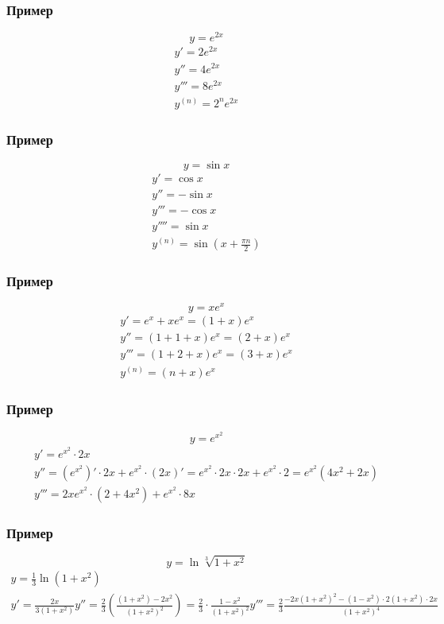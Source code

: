 \documentclass{article}
\begin{document}
\subsubsection{Пример}
\[
    y = e^{2x} 
\]
\begin{gather*}
    y'      = 2e^{2x} \\
    y''     = 4e^{2x} \\
    y'''    = 8e^{2x} \\
    y^{(n)} = 2^n e^{2x}
\end{gather*}

\subsubsection{Пример}
\[
    y = \sin x
\]
\begin{gather*}
    y'      =  \cos x \\
    y''     = -\sin x \\
    y'''    = -\cos x \\
    y''''   =  \sin x \\
    y^{(n)} =  \sin \left( x + \frac{\pi n}{2} \right)
\end{gather*}

\subsubsection{Пример}
\[
    y = xe^x
\]
\begin{gather*}
    y'      = e^x + xe^x     = (1 + x)e^x \\
    y''     = (1 + 1 + x)e^x = (2 + x)e^x \\
    y'''    = (1 + 2 + x)e^x = (3 + x)e^x \\
    y^{(n)} = (n + x)e^x
\end{gather*}

\subsubsection{Пример}
\[
    y = e^{x^2}
\]
\begin{gather*}
    y'   = e^{x^2} \cdot 2x \\
    y''  = (e^{x^2})' \cdot 2x + e^{x^2} \cdot (2x)' =
    e^{x^2} \cdot 2x \cdot 2x + e^{x^2} \cdot 2 =
    e^{x^2} (4x^2 + 2x) \\
    y''' = 2xe^{x^2} \cdot (2 + 4x^2) + e^{x^2} \cdot 8x
\end{gather*}

\subsubsection{Пример}
\[
    y = \ln \sqrt[3]{1 + x^2}
\]
\begin{gather*}
    y    = \frac{1}{3} \ln (1 + x^2) \\
    y'   = \frac{2x}{3(1 + x^2)}
    y''  = \frac{2}{3} \left( \frac{(1 + x^2) - 2x^2}{(1 + x^2)^2} \right) =
    \frac{2}{3} \cdot \frac{1 - x^2}{(1 + x^2)^2}
    y''' = \frac{2}{3} \frac{-2x(1 + x^2)^2 - (1 - x^2) \cdot 2 (1 + x^2) \cdot 2x}{(1 + x^2)^4}
\end{gather*}
\end{document}
